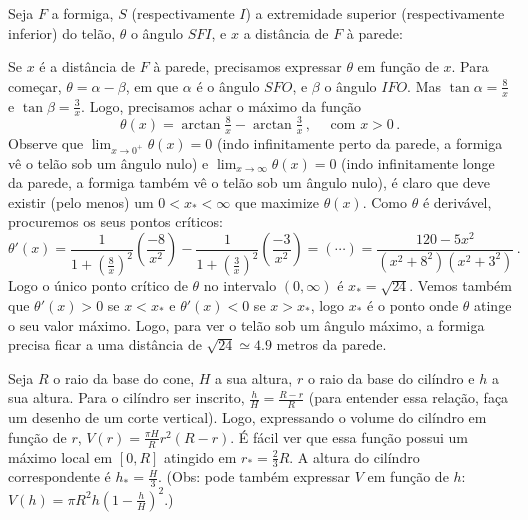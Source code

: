 \begin{Solution}{7.15}
Seja $F$ a formiga, $S$ (respectivamente $I$) a extremidade superior
(respectivamente inferior) do telão, $\theta$ o ângulo $SFI$, e $x$ a distância
de $F$ à parede:
\begin{center}
\begin{bmlimage}\end{bmlimage}
\end{center}
Se $x$ é a distância de $F$ à parede, precisamos expressar $\theta$ em função
de $x$. Para começar, $\theta=\alpha-\beta$, em que $\alpha$ é o ângulo $SFO$,
e $\beta$ o ângulo $IFO$. Mas $\tan \alpha =\frac{8}{x}$ e $\tan
\beta=\frac{3}{x}$. Logo, precisamos achar o máximo da função
$$
\theta(x)=\arctan\tfrac{8}{x}-\arctan \tfrac{3}{x}\,,\quad \text{ com }x>0\,.
$$
Observe que $\lim_{x\to 0^+}\theta(x)=0$ (indo infinitamente perto da
parede, a formiga vê o telão sob um ângulo nulo) e $\lim_{x\to
\infty}\theta(x)=0$ (indo infinitamente longe da parede, a
formiga também vê o telão sob um ângulo nulo), é claro que deve existir (pelo
menos) um $0<x_*<\infty$ que maximize $\theta(x)$. Como $\theta$ é derivável,
procuremos os seus pontos críticos:
$$
\theta'(x)=\frac{1}{1+(\tfrac8x)^2}(\frac{-8}{x^2})
-\frac{1}{1+(\tfrac3x)^2}(\frac{-3}{x^2})=(\cdots)=\frac{120-5x^2}{
(x^2+8^2)(x^2+3^2)}\,.
$$
Logo o único ponto crítico de $\theta$ no intervalo $(0,\infty)$ é
$x_*=\sqrt{24}$. Vemos também que $\theta'(x)>0$ se $x<x_*$ e
$\theta'(x)<0$ se $x>x_*$, logo $x_*$ é o ponto onde $\theta$ atinge o seu
valor máximo.
Logo, para ver o telão sob um ângulo máximo, a formiga precisa ficar a uma
distância de $\sqrt{24}\simeq 4.9$ metros da parede.
\end{Solution}
\begin{Solution}{7.16}
Seja $R$ o raio da base do cone, $H$ a sua altura, $r$ o raio da base do
cilíndro e $h$ a sua altura.
Para o cilíndro ser inscrito, $\frac{h}{H}=\frac{R-r}{R}$ (para entender essa
relação, faça um desenho de um corte vertical).
Logo, expressando o volume do cilíndro em função de $r$, $V(r)=\frac{\pi
H}{R}r^2(R-r)$. É fácil ver que essa função possui um máximo local em $[0,R]$
atingido em $r_*=\frac{2}{3}R$. A altura do cilíndro correspondente é
$h_*=\frac{H}{3}$.
(Obs: pode também expressar $V$ em função de $h$: $V(h)=\pi
R^2h(1-\frac{h}{H})^2$.)
\end{Solution}
